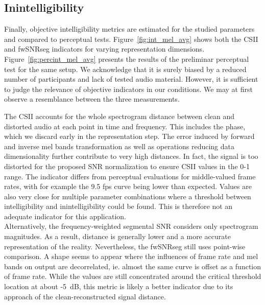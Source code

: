 \documentclass[final,3p,times,twocolumn]{elsarticle}
\begin{document}
\subsection{Inintelligibility}

Finally, objective intelligibility metrics are estimated for the studied parameters and compared to perceptual tests. Figure~\ref{fig:int_mel_avg} shows both the CSII and fwSNRseg indicators for varying representation dimensions. Figure~\ref{fig:percint_mel_avg} presents the results of the preliminar perceptual test for the same setup. We acknowledge that it is surely biased by a reduced number of participants and lack of tested audio material. However, it is sufficient to judge the relevance of objective indicators in our conditions. We may at first observe a resemblance between the three measurements. 

The CSII accounts for the whole spectrogram distance between clean and distorted audio at each point in time and frequency. This includes the phase, which we discard early in the representation step. The error induced by forward and inverse mel bands transformation as well as operations reducing data dimensionality further contribute to very high distances. In fact, the signal is too distorted for the proposed SNR normalization to ensure CSII values in the 0-1 range. The indicator differs from perceptual evaluations for middle-valued frame rates, with for example the 9.5 fps curve being lower than expected. Values are also very close for multiple parameter combinations where a threshold between intelligibility and inintelligibility could be found. This is therefore not an adequate indicator for this application.\\

Alternatively, the frequency-weighted segmental SNR considers only spectrogram magnitudes. As a result, distance is generally lower and a more accurate representation of the reality. Nevertheless, the fwSNRseg still uses point-wise comparison. A shape seems to appear where the influences of frame rate and mel bands on output are decorrelated, ie. almost the same curve is offset as a function of frame rate. While the values are still concentrated around the critical threshold location at about -5~dB, this metric is likely a better indicator due to its approach of the clean-reconstructed signal distance.
\end{document}
